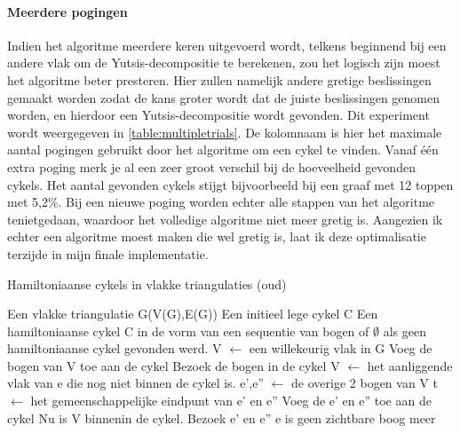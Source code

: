 \documentclass[11pt, a4paper, table]{article}
\makeatletter
\newenvironment{algoritme}[1][H]{%
	\renewcommand{\ALG@name}{Algoritme}%
	\renewcommand{\algorithmicrequire}{\textbf{Input:}}
	\renewcommand{\algorithmicensure}{\textbf{Output:}}
	\begin{algorithm}[#1]%
	}{\end{algorithm}}
\theoremstyle{definition}
\theoremstyle{definition}
\theoremstyle{definition}
\makeatother
\begin{document}
\paragraph{Meerdere pogingen}
Indien het algoritme meerdere keren uitgevoerd wordt, telkens beginnend bij een andere vlak om de Yutsis-decompositie te berekenen, zou het logisch zijn moest het algoritme beter presteren. Hier zullen namelijk andere gretige beslissingen gemaakt worden zodat de kans groter wordt dat de juiste beslissingen genomen worden, en hierdoor een Yutsis-decompositie wordt gevonden.  Dit experiment wordt weergegeven in \ref{table:multipletrials}. 
De kolomnaam is hier het maximale aantal pogingen gebruikt door het algoritme om een cykel te vinden. Vanaf \'{e}\'{e}n extra poging merk je al een zeer groot verschil bij de hoeveelheid gevonden cykels. Het aantal gevonden cykels stijgt bijvoorbeeld bij een graaf met 12 toppen met 5,2\%. Bij een nieuwe poging worden echter alle stappen van het algoritme tenietgedaan, waardoor het volledige algoritme niet meer gretig is. Aangezien ik echter een algoritme moest maken die wel gretig is, laat ik deze optimalisatie terzijde in mijn finale implementatie. 
\begin{tcolorbox}[blanker,float=b, grow to left by=2cm,grow to right by=2cm]
	\begin{algoritme}
		\caption{Hamiltoniaanse cykels in vlakke  triangulaties (oud)}
		\label{alg:hamilton2}
		\begin{algorithmic}[1]
			\Require Een vlakke triangulatie G(V(G),E(G))
			\Require Een initieel lege cykel C
			\Ensure Een hamiltoniaanse cykel C in de vorm van een sequentie van bogen of $\emptyset$ als geen hamiltoniaanse cykel gevonden werd.
			\State V $\gets$ een willekeurig vlak in G
			\State Voeg de bogen van V toe aan de cykel
			\State Bezoek de bogen in de cykel
			\State V $\gets$ het aanliggende vlak van e die nog niet binnen de cykel is. 
			\State e',e'' $\gets$ de overige 2 bogen van V
			\State t $\gets$ het gemeenschappelijke eindpunt van e' en e''
			\State Voeg de e' en e'' toe aan de cykel
			\Comment Nu is V binnenin de cykel. 
			\State Bezoek e' en e''
			\Else 
			\State e is geen zichtbare boog meer
			\EndIf 
			\EndFor
			\EndWhile
		\end{algorithmic}
	\end{algoritme}
\end{tcolorbox}
\end{document}
